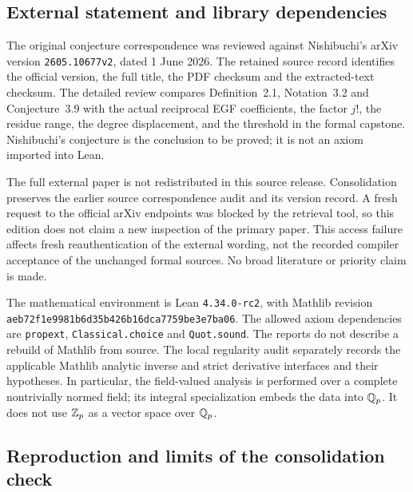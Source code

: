\subsection{External statement and library dependencies}

The original conjecture correspondence was reviewed against Nishibuchi's
arXiv version \texttt{2605.10677v2}, dated 1 June 2026. The retained source
record identifies the official version, the full title, the PDF checksum and
the extracted-text checksum. The detailed review compares Definition~2.1,
Notation~3.2 and Conjecture~3.9 with the actual reciprocal EGF coefficients,
the factor $j!$, the residue range, the degree displacement, and the threshold
in the formal capstone. Nishibuchi's conjecture is the conclusion to be
proved; it is not an axiom imported into Lean.

The full external paper is not redistributed in this source release.
Consolidation preserves the earlier source correspondence audit and its
version record. A fresh request to the official arXiv endpoints was blocked
by the retrieval tool, so this edition does not claim a new inspection of the
primary paper. This access failure affects fresh reauthentication of the
external wording, not the recorded compiler acceptance of the unchanged
formal sources. No broad literature or priority claim is made.

The mathematical environment is Lean \texttt{4.34.0-rc2}, with Mathlib revision
\nolinkurl{aeb72f1e9981b6d35b426b16dca7759be3e7ba06}.
The allowed axiom dependencies are
\texttt{propext}, \texttt{Classical.choice} and \texttt{Quot.sound}.
The reports do not describe a rebuild of Mathlib from source. The local
regularity audit separately records the applicable Mathlib analytic inverse
and strict derivative interfaces and their hypotheses. In particular, the
field-valued analysis is performed over a complete nontrivially normed field;
its integral specialization embeds the data into $\mathbb Q_p$. It does not use
$\mathbb Z_p$ as a vector space over $\mathbb Q_p$.

\subsection{Reproduction and limits of the consolidation check}

